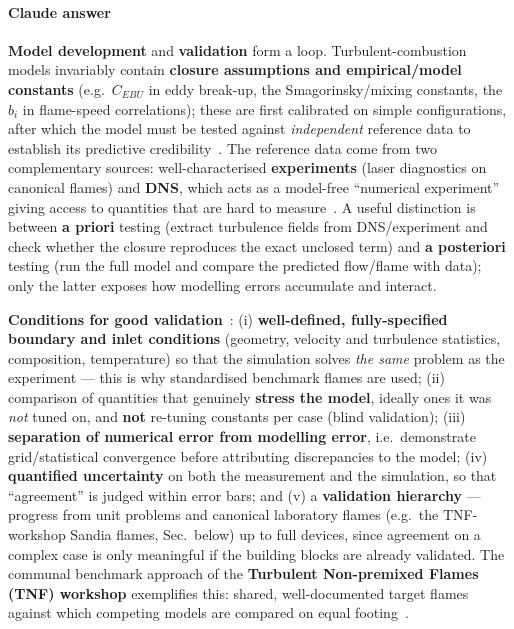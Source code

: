 {\color{istblue}
\paragraph{Claude answer}
\textbf{Model development} and \textbf{validation} form a loop. Turbulent-combustion models invariably contain \textbf{closure assumptions and empirical/model constants} (e.g.\ $C_{EBU}$ in eddy break-up, the Smagorinsky/mixing constants, the $b_i$ in flame-speed correlations); these are first calibrated on simple configurations, after which the model must be tested against \emph{independent} reference data to establish its predictive credibility~\cite{lecture10,veynante2002turbulent}. The reference data come from two complementary sources: well-characterised \textbf{experiments} (laser diagnostics on canonical flames) and \textbf{DNS}, which acts as a model-free ``numerical experiment'' giving access to quantities that are hard to measure~\cite{lecture10,pope2000turbulent}. A useful distinction is between \textbf{a priori} testing (extract turbulence fields from DNS/experiment and check whether the closure reproduces the exact unclosed term) and \textbf{a posteriori} testing (run the full model and compare the predicted flow/flame with data); only the latter exposes how modelling errors accumulate and interact.

\textbf{Conditions for good validation}~\cite{lecture10,roekaerts2010jmbc,veynante2002turbulent}: (i) \textbf{well-defined, fully-specified boundary and inlet conditions} (geometry, velocity and turbulence statistics, composition, temperature) so that the simulation solves \emph{the same} problem as the experiment --- this is why standardised benchmark flames are used; (ii) comparison of quantities that genuinely \textbf{stress the model}, ideally ones it was \emph{not} tuned on, and \textbf{not} re-tuning constants per case (blind validation); (iii) \textbf{separation of numerical error from modelling error}, i.e.\ demonstrate grid/statistical convergence before attributing discrepancies to the model; (iv) \textbf{quantified uncertainty} on both the measurement and the simulation, so that ``agreement'' is judged within error bars; and (v) a \textbf{validation hierarchy} --- progress from unit problems and canonical laboratory flames (e.g.\ the TNF-workshop Sandia flames, Sec.~below) up to full devices, since agreement on a complex case is only meaningful if the building blocks are already validated. The communal benchmark approach of the \textbf{Turbulent Non-premixed Flames (TNF) workshop} exemplifies this: shared, well-documented target flames against which competing models are compared on equal footing~\cite{barlowfrank1998sandia,lecture10}.
}





